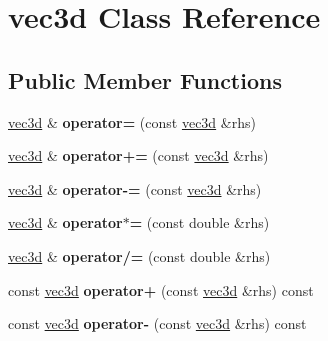 \hypertarget{classvec3d}{
\section{vec3d Class Reference}
\label{classvec3d}
}
\subsection*{Public Member Functions}
\begin{DoxyCompactItemize}
\item 
\hypertarget{classvec3d_acfa997807027bacdbf49b33512fe2c36}{
\hyperlink{classvec3d}{vec3d} \& {\bfseries operator=} (const \hyperlink{classvec3d}{vec3d} \&rhs)}
\label{classvec3d_acfa997807027bacdbf49b33512fe2c36}

\item 
\hypertarget{classvec3d_a514eae21e259c211dfb87569013fbad3}{
\hyperlink{classvec3d}{vec3d} \& {\bfseries operator+=} (const \hyperlink{classvec3d}{vec3d} \&rhs)}
\label{classvec3d_a514eae21e259c211dfb87569013fbad3}

\item 
\hypertarget{classvec3d_a715c0c24241ea547a038c5915b61c966}{
\hyperlink{classvec3d}{vec3d} \& {\bfseries operator-\/=} (const \hyperlink{classvec3d}{vec3d} \&rhs)}
\label{classvec3d_a715c0c24241ea547a038c5915b61c966}

\item 
\hypertarget{classvec3d_af0f59ccc9a900ff32bc7be9598b8755e}{
\hyperlink{classvec3d}{vec3d} \& {\bfseries operator$\ast$=} (const double \&rhs)}
\label{classvec3d_af0f59ccc9a900ff32bc7be9598b8755e}

\item 
\hypertarget{classvec3d_aabf1d6bfbc627b04f59a992cac403f96}{
\hyperlink{classvec3d}{vec3d} \& {\bfseries operator/=} (const double \&rhs)}
\label{classvec3d_aabf1d6bfbc627b04f59a992cac403f96}

\item 
\hypertarget{classvec3d_a78c62925d653d0844f44e7972f01b3f8}{
const \hyperlink{classvec3d}{vec3d} {\bfseries operator+} (const \hyperlink{classvec3d}{vec3d} \&rhs) const }
\label{classvec3d_a78c62925d653d0844f44e7972f01b3f8}

\item 
\hypertarget{classvec3d_afab974709f5727be8828230c8522891e}{
const \hyperlink{classvec3d}{vec3d} {\bfseries operator-\/} (const \hyperlink{classvec3d}{vec3d} \&rhs) const }
\label{classvec3d_afab974709f5727be8828230c8522891e}


\end{DoxyCompactItemize}
